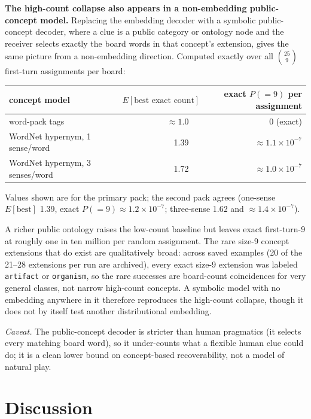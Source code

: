 \documentclass[11pt]{article}
\begin{document}
\textbf{The high-count collapse also appears in a non-embedding public-concept
model.} Replacing the embedding decoder with a symbolic public-concept decoder,
where a clue is a public category or ontology node and the receiver selects
exactly the board words in that concept's extension, gives the same picture from a
non-embedding direction. Computed exactly over all $\binom{25}{9}$ first-turn
assignments per board:

\begin{center}
\begin{tabular}{lrr}
\toprule
concept model & $E[\text{best exact count}]$ & exact $P(=9)$ per assignment \\
\midrule
word-pack tags & $\approx 1.0$ & 0 (exact) \\
WordNet hypernym, 1 sense/word & 1.39 & $\approx 1.1 \times 10^{-7}$ \\
WordNet hypernym, 3 senses/word & 1.72 & $\approx 1.0 \times 10^{-7}$ \\
\bottomrule
\end{tabular}
\end{center}

Values shown are for the primary pack; the second pack agrees (one-sense
$E[\text{best}]$ 1.39, exact $P(=9) \approx 1.2 \times 10^{-7}$; three-sense 1.62
and $\approx 1.4 \times 10^{-7}$).

A richer public ontology raises the low-count baseline but leaves exact
first-turn-9 at roughly one in ten million per random assignment. The rare size-9
concept extensions that do exist are qualitatively broad: across saved examples
(20 of the 21--28 extensions per run are archived), every exact size-9 extension
was labeled \texttt{artifact} or \texttt{organism}, so the rare successes are
board-count coincidences for very general classes, not narrow high-count concepts.
A symbolic model with no embedding anywhere in it therefore reproduces the
high-count collapse, though it does not by itself test another distributional
embedding.

\emph{Caveat.} The public-concept decoder is stricter than human pragmatics (it
selects every matching board word), so it under-counts what a flexible human clue
could do; it is a clean lower bound on concept-based recoverability, not a model
of natural play.

\section{Discussion}\label{sec:discussion}
\end{document}
